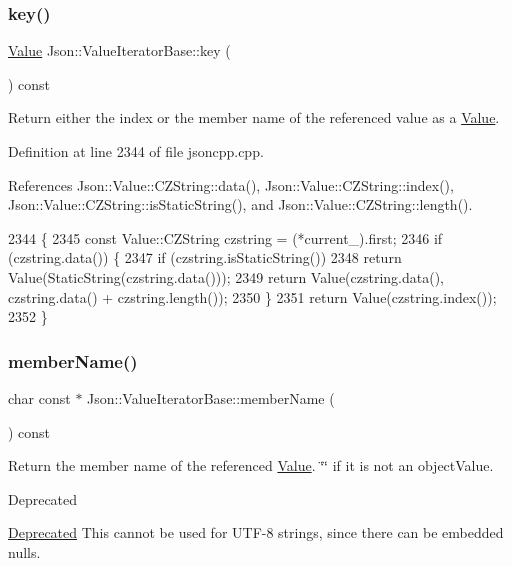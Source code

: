 \subsubsection{\texorpdfstring{key()}{key()}}
{\footnotesize\ttfamily \hyperlink{class_json_1_1_value}{Value} Json\+::\+Value\+Iterator\+Base\+::key (\begin{DoxyParamCaption}{ }\end{DoxyParamCaption}) const}

Return either the index or the member name of the referenced value as a \hyperlink{class_json_1_1_value}{Value}. 

Definition at line 2344 of file jsoncpp.\+cpp.



References Json\+::\+Value\+::\+C\+Z\+String\+::data(), Json\+::\+Value\+::\+C\+Z\+String\+::index(), Json\+::\+Value\+::\+C\+Z\+String\+::is\+Static\+String(), and Json\+::\+Value\+::\+C\+Z\+String\+::length().


\begin{DoxyCode}
2344                                    \{
2345   \textcolor{keyword}{const} Value::CZString czstring = (*current\_).first;
2346   \textcolor{keywordflow}{if} (czstring.data()) \{
2347     \textcolor{keywordflow}{if} (czstring.isStaticString())
2348       \textcolor{keywordflow}{return} Value(StaticString(czstring.data()));
2349     \textcolor{keywordflow}{return} Value(czstring.data(), czstring.data() + czstring.length());
2350   \}
2351   \textcolor{keywordflow}{return} Value(czstring.index());
2352 \}
\end{DoxyCode}
\mbox{\label{class_json_1_1_value_iterator_base_a54765da6759fd3f1edcbfbaf308ec263}} 
\subsubsection{\texorpdfstring{member\+Name()}{memberName()}\hspace{0.1cm}{\footnotesize\ttfamily [1/2]}}
{\footnotesize\ttfamily char const  $\ast$ Json\+::\+Value\+Iterator\+Base\+::member\+Name (\begin{DoxyParamCaption}{ }\end{DoxyParamCaption}) const}

Return the member name of the referenced \hyperlink{class_json_1_1_value}{Value}. \char`\"{}\char`\"{} if it is not an object\+Value. \begin{DoxyRefDesc}{Deprecated}
\item[\hyperlink{deprecated__deprecated000004}{Deprecated}]This cannot be used for U\+T\+F-\/8 strings, since there can be embedded nulls. \end{DoxyRefDesc}


